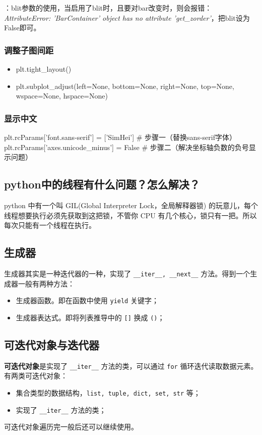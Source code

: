 ：blit参数的使用，当启用了blit时，且要对bar改变时，则会报错：\textit{AttributeError: 'BarContainer' object has no attribute 'get\_zorder'}，把blit设为False即可。


\subsubsection{调整子图间距}
\begin{itemize}
	\item plt.tight\_layout()
	\item plt.subplot\_adjust(left=None, bottom=None, right=None, top=None, wspace=None, hspace=None)
\end{itemize}

\subsubsection{显示中文}
\begin{python}
	plt.rcParams['font.sans-serif'] = ['SimHei'] # 步骤一（替换sans-serif字体）  
	plt.rcParams['axes.unicode_minus'] = False  # 步骤二（解决坐标轴负数的负号显示问题）
\end{python}

\subsection{python中的线程有什么问题？怎么解决？}
python 中有一个叫 GIL(Global Interpreter Lock，全局解释器锁) 的玩意儿，每个线程想要执行必须先获取到这把锁，不管你 CPU 有几个核心，锁只有一把。所以每次只能有一个线程在执行。

 
\subsection{生成器}
生成器其实是一种迭代器的一种，实现了 \texttt{__iter__, __next__} 方法。得到一个生成器一般有两种方法：
\begin{itemize}
	\item 生成器函数。即在函数中使用 \texttt{yield} 关键字；
	
	\item 生成器表达式。即将列表推导中的 \texttt{[]} 换成 \texttt{()}；
\end{itemize}
 
\subsection{可迭代对象与迭代器}
\textbf{可迭代对象}是实现了 \texttt{__iter__} 方法的类，可以通过 \texttt{for} 循环迭代读取数据元素。有两类可迭代对象：
\begin{itemize}
	\item 集合类型的数据结构，\texttt{list, tuple, dict, set, str} 等；
	
	\item 实现了 \texttt{__iter__} 方法的类；
\end{itemize}
可迭代对象遍历完一般后还可以继续使用。


